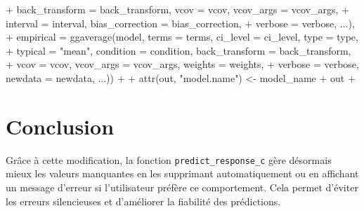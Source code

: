 \documentclass{article}
\begin{document}
\begin{Schunk}
\begin{Sinput}
\begin{Schunk}
\begin{Sinput}
{+                                            back_transform = back_transform, vcov = vcov, vcov_args = vcov_args,
+                                            interval = interval, bias_correction = bias_correction,
+                                            verbose = verbose, ...),
+                 empirical = ggaverage(model, terms = terms, ci_level = ci_level, type = type,
+                                       typical = "mean", condition = condition, back_transform = back_transform,
+                                       vcov = vcov, vcov_args = vcov_args, weights = weights,
+                                       verbose = verbose, newdata = newdata, ...))
+ 
+   attr(out, "model.name") <- model_name
+   out
+ }
\end{Sinput}
\end{Schunk}
\end{Sinput}
\end{Schunk}

\section{Conclusion}
Grâce à cette modification, la fonction \texttt{predict\_response\_c} gère désormais mieux les valeurs manquantes en les supprimant automatiquement ou en affichant un message d'erreur si l'utilisateur préfère ce comportement.
Cela permet d'éviter les erreurs silencieuses et d'améliorer la fiabilité des prédictions.
\end{document}

